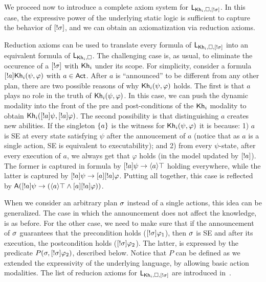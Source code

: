 We proceed now to introduce a complete axiom system for $\mathsf{L}_{{\sf Kh}_i,\square,[!\sigma]}$. In this case, the expressive power of the underlying static logic is sufficient to capture the behavior of $[!\sigma]$, and we can obtain an axiomatization via reduction axioms.

Reduction axioms can be used to translate every formula of $\mathsf{L}_{{\sf Kh}_i,\square,[!\sigma]}$ into an equivalent formula of $\mathsf{L}_{{\sf Kh}_i,\square}$. The challenging case is, as usual, to eliminate the occurence of a $[!\sigma]$ with ${\sf Kh}_i$ under its scope. For simplicity, consider a formula $[!a]{\sf Kh}_i(\psi,\varphi)$ with $a\in{\rm \sf Act}$. After $a$ is ``announced'' to be different from any other plan, there are two possible reasons of why ${\sf Kh}_i(\psi,\varphi)$ holds. The first is that $a$ plays no role in the truth of ${\sf Kh}_i(\psi,\varphi)$. In this case, we can push the dynamic modality into the front of the pre and post-conditions of the ${\sf Kh}_i$ modality to obtain ${\sf Kh}_i([!a]\psi,[!a]\varphi)$. The second possibility is that distinguishing $a$ creates new abilities. If the singleton $\{ a \}$ is the witness for ${\sf Kh}_i(\psi,\varphi)$ it is because: 1) $a$ is SE at every state satisfying $\psi$ after the annoucement of $a$ (notice that as $a$ is a single action, SE is equivalent to executability); and 2) from every $\psi$-state, after every execution of $a$, we always get that $\varphi$ holds (in the model updated by $[!a]$). The former is captured in formula by $[!a]\psi \rightarrow \langle a \rangle\top$ holding everywhere, while the latter is captured by $[!a]\psi \rightarrow [a][!a]\varphi$. Putting all together, this case is reflected by ${\sf A}([!a]\psi\rightarrow(\langle a \rangle\top\wedge[a][!a]\varphi))$.

When we consider an arbitrary plan $\sigma$ instead of a single actions, this idea can be generalized. The case in which the announcement does not affect the knowledge, is as before. For the other case, we need to make sure that if the announcement of $\sigma$ guarantees that the precondition holds ($[!\sigma]\varphi_1$), then $\sigma$ is SE and after its execution, the postcondition holds ($[!\sigma]\varphi_2$). 
The latter, is expressed by the predicate $P(\sigma,[!\sigma]\varphi_2)$, described below. Notice that $P$ can be defined as we extended the expressivity of the underlying language, by allowing basic action modalities. The list of reducion axioms for $\mathsf{L}_{{\sf Kh}_i,\square,[!\sigma]}$ are introduced in~.

